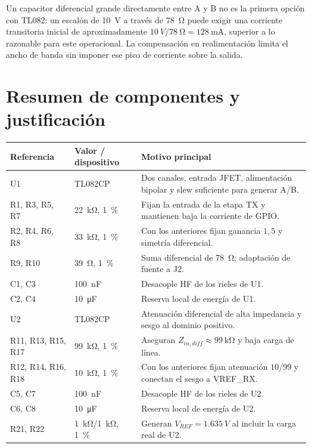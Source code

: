 \documentclass[11pt,a4paper]{article}
\begin{document}
Un capacitor diferencial grande directamente entre A y B no es la primera
opción con TL082: un escalón de \SI{10}{V} a través de \SI{78}{\ohm} puede
exigir una corriente transitoria inicial de aproximadamente
$\SI{10}{V}/\SI{78}{\ohm}=\SI{128}{\milli\ampere}$, superior a lo razonable
para este operacional. La compensación en realimentación limita el ancho de
banda sin imponer ese pico de corriente sobre la salida.

\section{Resumen de componentes y justificación}

\begin{longtable}{@{}p{28mm}p{23mm}p{109mm}@{}}
\toprule
Referencia & Valor / dispositivo & Motivo principal \\
\midrule
\endhead
U1 & TL082CP & Dos canales, entrada JFET, alimentación bipolar y slew suficiente para generar A/B. \\
R1, R3, R5, R7 & \SI{22}{\kilo\ohm}, \SI{1}{\percent} & Fijan la entrada de la etapa TX y mantienen baja la corriente de GPIO. \\
R2, R4, R6, R8 & \SI{33}{\kilo\ohm}, \SI{1}{\percent} & Con los anteriores fijan ganancia $1{,}5$ y simetría diferencial. \\
R9, R10 & \SI{39}{\ohm}, \SI{1}{\percent} & Suma diferencial de \SI{78}{\ohm}; adaptación de fuente a J2. \\
C1, C3 & \SI{100}{\nano\farad} & Desacople HF de los rieles de U1. \\
C2, C4 & \SI{10}{\micro\farad} & Reserva local de energía de U1. \\
U2 & TL082CP & Atenuación diferencial de alta impedancia y sesgo al dominio positivo. \\
R11, R13, R15, R17 & \SI{99}{\kilo\ohm}, \SI{1}{\percent} & Aseguran $Z_{in,diff}\approx\SI{99}{\kilo\ohm}$ y baja carga de línea. \\
R12, R14, R16, R18 & \SI{10}{\kilo\ohm}, \SI{1}{\percent} & Con los anteriores fijan atenuación $10/99$ y conectan el sesgo a VREF\_RX. \\
C5, C7 & \SI{100}{\nano\farad} & Desacople HF de los rieles de U2. \\
C6, C8 & \SI{10}{\micro\farad} & Reserva local de energía de U2. \\
R21, R22 & \SI{1}{\kilo\ohm}/\SI{1}{\kilo\ohm}, \SI{1}{\percent} & Generan $V_{REF}=\SI{1.635}{V}$ al incluir la carga real de U2. \\

\end{longtable}
\end{document}
